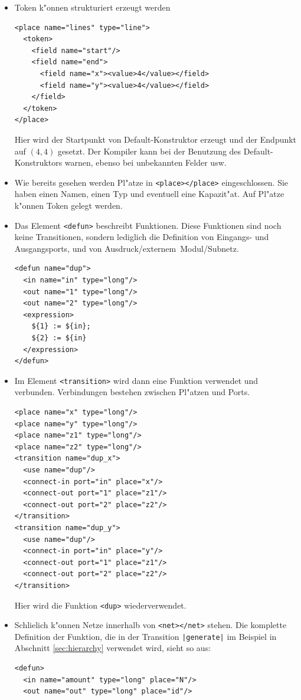 \documentclass[a4paper,12pt]{article}
\newlength{\st}\setlength{\st}{0pt}
\newcommand{\transition}[1]{\texttt{|#1|}}
\newcommand{\element}[1]{\texttt{<#1>}}
\newcommand{\function}[1]{\texttt{<#1>}}
\begin{document}
\begin{itemize}
\item Token k"onnen strukturiert erzeugt werden
\begin{verbatim}
<place name="lines" type="line">
  <token>
    <field name="start"/>
    <field name="end">
      <field name="x"><value>4</value></field>
      <field name="y"><value>4</value></field>
    </field>
  </token>
</place>
\end{verbatim}
  Hier wird der Startpunkt von Default-Konstruktor erzeugt und der
  Endpunkt auf $(4,4)$ gesetzt. Der Kompiler kann bei der Benutzung
  des Default-Konstruktors warnen, ebenso bei unbekannten Felder usw.

\item Wie bereits gesehen werden Pl"atze in \element{place></place}
  eingeschlossen. Sie haben einen Namen, einen Typ und eventuell eine
  Kapazit"at. Auf Pl"atze k"onnen Token gelegt werden.

\item Das Element \element{defun} beschreibt Funktionen. Diese
  Funktionen sind noch keine Transitionen, sondern lediglich die
  Definition von Eingangs- und Ausgangsports, und von
  Ausdruck/externem~Modul/Subnetz.
\begin{verbatim}
<defun name="dup">
  <in name="in" type="long"/>
  <out name="1" type="long"/>
  <out name="2" type="long"/>
  <expression>
    ${1} := ${in};
    ${2} := ${in}
  </expression>
</defun>
\end{verbatim}

\item Im Element \element{transition} wird dann eine Funktion
  verwendet und verbunden. Verbindungen bestehen zwischen Pl"atzen und
  Ports.
\begin{verbatim}
<place name="x" type="long"/>
<place name="y" type="long"/>
<place name="z1" type="long"/>
<place name="z2" type="long"/>
<transition name="dup_x">
  <use name="dup"/>
  <connect-in port="in" place="x"/>
  <connect-out port="1" place="z1"/>
  <connect-out port="2" place="z2"/>
</transition>
<transition name="dup_y">
  <use name="dup"/>
  <connect-in port="in" place="y"/>
  <connect-out port="1" place="z1"/>
  <connect-out port="2" place="z2"/>
</transition>
\end{verbatim}

  Hier wird die Funktion \function{dup} wiederverwendet.

\item Schlie\3lich k"onnen Netze innerhalb von \element{net></net}
  stehen. Die komplette Definition der Funktion, die in der Transition
  \transition{generate} im Beispiel in Abschnitt \ref{sec:hierarchy}
  verwendet wird, sieht so aus:
\begin{verbatim}
<defun>
  <in name="amount" type="long" place="N"/>
  <out name="out" type="long" place="id"/>


\end{verbatim}
\end{itemize}
\end{document}
